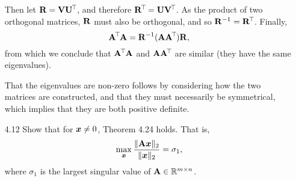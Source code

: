 \documentclass[11pt]{article}
\begin{document}
\begin{enumerate}
          Then let $\mathbf{R} = \mathbf{V} \mathbf{U}^{\mkern-2.5mu\top\mkern-2mu}$, and therefore $\mathbf{R}^{\mkern-2.5mu\top\mkern-2mu} =
              \mathbf{U}\mathbf{V}^{\mkern-2.5mu\top\mkern-2mu}$.  As the product of two orthogonal matrices, $\mathbf{R}$ must also be
          orthogonal, and so $\mathbf{R}^{-1} = \mathbf{R}^{\mkern-2.5mu\top\mkern-2mu}$.  Finally,
          \[
              \mathbf{A}^{\mkern-2.5mu\top\mkern-2mu} \mathbf{A} = \mathbf{R}^{-1} (\mathbf{A} \mathbf{A}^{\mkern-2.5mu\top\mkern-2mu}) \mathbf{R},
          \]
          from which we conclude that $\mathbf{A}^{\mkern-2.5mu\top\mkern-2mu} \mathbf{A}$ and $\mathbf{A} \mathbf{A}^{\mkern-2.5mu\top\mkern-2mu}$ are
          similar (they have the same eigenvalues).

          That the eigenvalues are non-zero follows by considering how the two matrices are
          constructed, and that they must necessarily be symmetrical, which implies that they are
          both positive definite.

    \item[4.12] Show that for $\bm{x} \neq 0$, Theorem 4.24 holds.  That is,
          \[
              \max_{\bm{x}} \frac{ \lVert\mathbf{A} \bm{x}\rVert_2 }{ \lVert\bm{x}\rVert_2 } = \sigma_1,
          \]
          where $\sigma_1$ is the largest singular value of $\mathbf{A} \in \mathbb{R}^{m \times n}$.

\end{enumerate}
\end{document}
